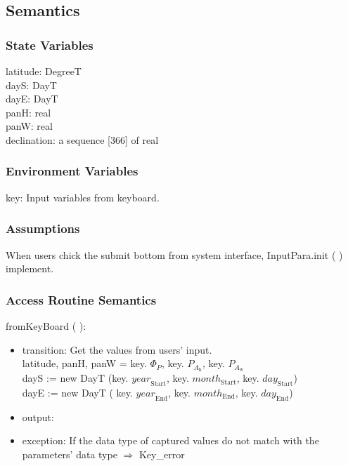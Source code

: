 \documentclass[12pt, titlepage]{article}
\begin{document}
\subsection{Semantics}

\subsubsection{State Variables}
latitude: DegreeT\\
dayS: DayT \\
dayE: DayT\\
panH: real\\
panW: real\\
declination: a sequence [366] of real


\subsubsection{Environment Variables}
key: Input variables from keyboard.

\subsubsection{Assumptions}
When users chick the submit bottom from system interface, InputPara.init ( ) implement.

\subsubsection{ Access Routine Semantics}

\noindent  fromKeyBoard ( ):
\begin{itemize}
\item transition: Get the values from users' input.\\
latitude, panH, panW = key. $\Phi_P$, key. $P_{A_{\text{h}}}$, key. $P_{A_{\text{w}}}$\\

dayS := new DayT (key. $\mathit{year}_\text{Start}$, key. $\mathit{month}_\text{Start}$, key. $\mathit{day}_\text{Start}$) \\

dayE :=  new DayT ( key. $\mathit{year}_\text{End}$, key. $\mathit{month}_\text{End}$, key. $\mathit{day}_\text{End}$)\\
\item output:
\item exception: If the data type of captured values do not match with the parameters' data type $\Rightarrow$ Key\_error
\end{itemize}
\end{document}
